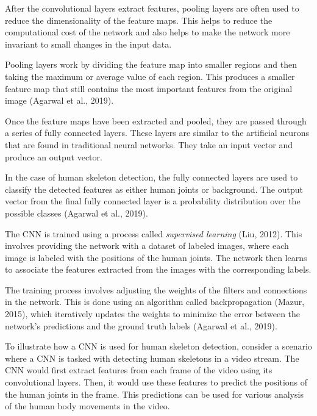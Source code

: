 
After the convolutional layers extract features, pooling layers are often used to reduce the dimensionality of the feature maps. This helps to reduce the computational cost of the network and also helps to make the network more invariant to small changes in the input data.

Pooling layers work by dividing the feature map into smaller regions and then taking the maximum or average value of each region. This produces a smaller feature map that still contains the most important features from the original image (\scc Agarwal et al., 2019).


Once the feature maps have been extracted and pooled, they are passed through a series of fully connected layers. These layers are similar to the artificial neurons that are found in traditional neural networks. They take an input vector and produce an output vector.

In the case of human skeleton detection, the fully connected layers are used to classify the detected features as either human joints or background. The output vector from the final fully connected layer is a probability distribution over the possible classes (\scc Agarwal et al., 2019).


The CNN is trained using a process called {\em supervised learning} (\scc Liu, 2012). This involves providing the network with a dataset of labeled images, where each image is labeled with the positions of the human joints. The network then learns to associate the features extracted from the images with the corresponding labels.

The training process involves adjusting the weights of the filters and connections in the network. This is done using an algorithm called backpropagation (\scc Mazur, 2015), which iteratively updates the weights to minimize the error between the network's predictions and the ground truth labels (\scc Agarwal et al., 2019).


To illustrate how a CNN is used for human skeleton detection, consider a scenario where a CNN is tasked with detecting human skeletons in a video stream. The CNN would first extract features from each frame of the video using its convolutional layers. Then, it would use these features to predict the positions of the human joints in the frame. This predictions can be used for various analysis of the human body movements in the video.

